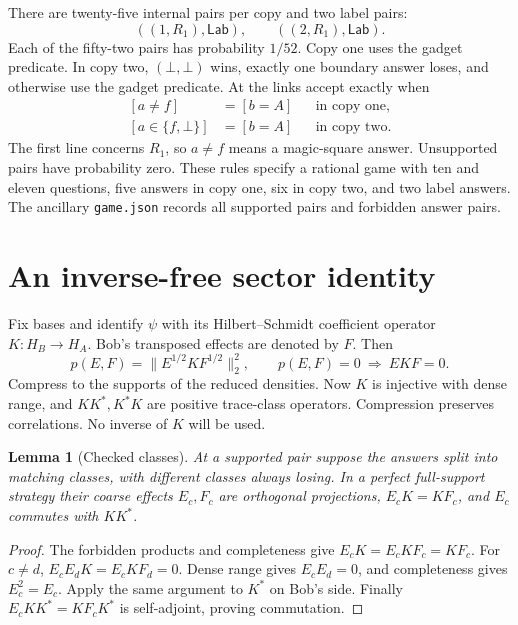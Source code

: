 \documentclass[11pt]{article}
\newtheorem{lemma}[theorem]{Lemma}
\theoremstyle{definition}
\begin{document}
There are twenty-five internal pairs per copy and two label pairs:
\[
((1,R_1),\mathsf{Lab}),\qquad ((2,R_1),\mathsf{Lab}).
\]
Each of the fifty-two pairs has probability $1/52$. Copy one uses the gadget predicate. In copy two, $(\bot,\bot)$ wins, exactly one boundary answer loses, and otherwise use the gadget predicate. At the links accept exactly when
\begin{align}\label{eq:links}
[a\ne f]&=[b=A]&&\text{in copy one},\nonumber\\
[a\in\{f,\bot\}]&=[b=A]&&\text{in copy two}.
\end{align}
The first line concerns $R_1$, so $a\ne f$ means a magic-square answer. Unsupported pairs have probability zero. These rules specify a rational game with ten and eleven questions, five answers in copy one, six in copy two, and two label answers. The ancillary \texttt{game.json} records all supported pairs and forbidden answer pairs.

\section{An inverse-free sector identity}\label{sec:sector}
Fix bases and identify $\psi$ with its Hilbert--Schmidt coefficient operator $K:H_B\to H_A$. Bob's transposed effects are denoted by $F$. Then
\begin{equation}\label{eq:zero}
p(E,F)=\|E^{1/2}KF^{1/2}\|_2^2,\qquad p(E,F)=0\ \Longrightarrow\ EKF=0.
\end{equation}
Compress to the supports of the reduced densities. Now $K$ is injective with dense range, and $KK^*,K^*K$ are positive trace-class operators. Compression preserves correlations. No inverse of $K$ will be used.

\begin{lemma}[Checked classes]\label{lem:classes}
At a supported pair suppose the answers split into matching classes, with different classes always losing. In a perfect full-support strategy their coarse effects $E_c,F_c$ are orthogonal projections, $E_cK=KF_c$, and $E_c$ commutes with $KK^*$.
\end{lemma}
\begin{proof}
The forbidden products and completeness give $E_cK=E_cKF_c=KF_c$. For $c\ne d$, $E_cE_dK=E_cKF_d=0$. Dense range gives $E_cE_d=0$, and completeness gives $E_c^2=E_c$. Apply the same argument to $K^*$ on Bob's side. Finally $E_cKK^*=KF_cK^*$ is self-adjoint, proving commutation.
\end{proof}
\end{document}
